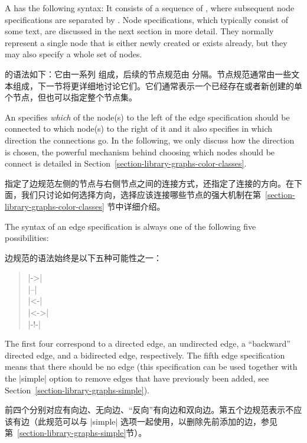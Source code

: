 A  has the following syntax: It consists of a
sequence of , where subsequent node specifications
are separated by . Node specifications, which
typically consist of some text, are discussed in the next section in more
detail. They normally represent a single node that is either newly created or
exists already, but they may also specify a whole set of nodes.

 的语法如下：它由一系列  组成，后续的节点规范由  分隔。节点规范通常由一些文本组成，下一节将更详细地讨论它们。它们通常表示一个已经存在或者新创建的单个节点，但也可以指定整个节点集。

An  specifies \emph{which} of the node(s) to the left
of the edge specification should be connected to which node(s) to the right of
it and it also specifies in which direction the connections go. In the
following, we only discuss how the direction is chosen, the powerful mechanism
behind choosing which nodes should be connect is detailed in
Section~\ref{section-library-graphs-color-classes}.

 指定了边规范左侧的节点与右侧节点之间的连接方式，还指定了连接的方向。在下面，我们只讨论如何选择方向，选择应该连接哪些节点的强大机制在第~\ref{section-library-graphs-color-classes} 节中详细介绍。

The syntax of an edge specification is always one of the following five
possibilities:

边规范的语法始终是以下五种可能性之一：

%
\begin{quote}
    |->| \\
    |--| \\
    |<-| \\
    |<->| \\
    |-!-| 
\end{quote}

The first four correspond to a directed edge, an undirected edge, a
``backward'' directed edge, and a bidirected edge, respectively. The fifth edge
specification means that there should be no edge (this specification can be
used together with the |simple| option to remove edges that have previously
been added, see Section~\ref{section-library-graphs-simple}).

前四个分别对应有向边、无向边、``反向''有向边和双向边。第五个边规范表示不应该有边（此规范可以与 |simple| 选项一起使用，以删除先前添加的边，参见第~\ref{section-library-graphs-simple}节）。

